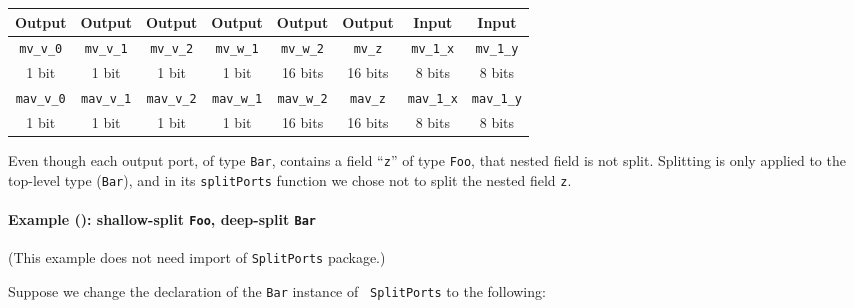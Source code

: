 \begin{center}
  \begin{tabular}{|c|c|c|c|c|c||c|c|}
    \hline
     Output &
     Output &
     Output &
     Output &
     Output &
     Output &
     Input  &
     Input  \\
    \hline
     {\tt mv\_v\_0}  &
     {\tt mv\_v\_1}  &
     {\tt mv\_v\_2}  &
     {\tt mv\_w\_1}  &
     {\tt mv\_w\_2}  &
     {\tt mv\_z}     &
     {\tt mv\_1\_x}  &
     {\tt mv\_1\_y} \\
      1 bit  &
      1 bit  &
      1 bit  &
      1 bit  &
     16 bits &
     16 bits &
      8 bits &
      8 bits \\
    \hline
     {\tt mav\_v\_0}  &
     {\tt mav\_v\_1}  &
     {\tt mav\_v\_2}  &
     {\tt mav\_w\_1}  &
     {\tt mav\_w\_2}  &
     {\tt mav\_z}     &
     {\tt mav\_1\_x}  &
     {\tt mav\_1\_y} \\
      1 bit  &
      1 bit  &
      1 bit  &
      1 bit  &
     16 bits &
     16 bits &
      8 bits &
      8 bits \\
    \hline
  \end{tabular}
\end{center}

Even though each output port, of type {\tt Bar}, contains a field
``{\tt z}'' of type {\tt Foo}, that nested field is not split.
Splitting is only applied to the top-level type ({\tt Bar}), and in
its {\tt splitPorts} function we chose not to split the nested field
{\tt z}.


\paragraph{Example (\BH): shallow-split {\tt Foo}, deep-split {\tt Bar}}

\label{sec:splitports_examples_BH_Foo_Shallow_Bar_Deep}

\hspace*{1em}

{\footnotesize (This example does not need import of {\tt SplitPorts} package.)}

Suppose we change the declaration of the {\tt Bar} instance of {\tt
SplitPorts} to the following:

